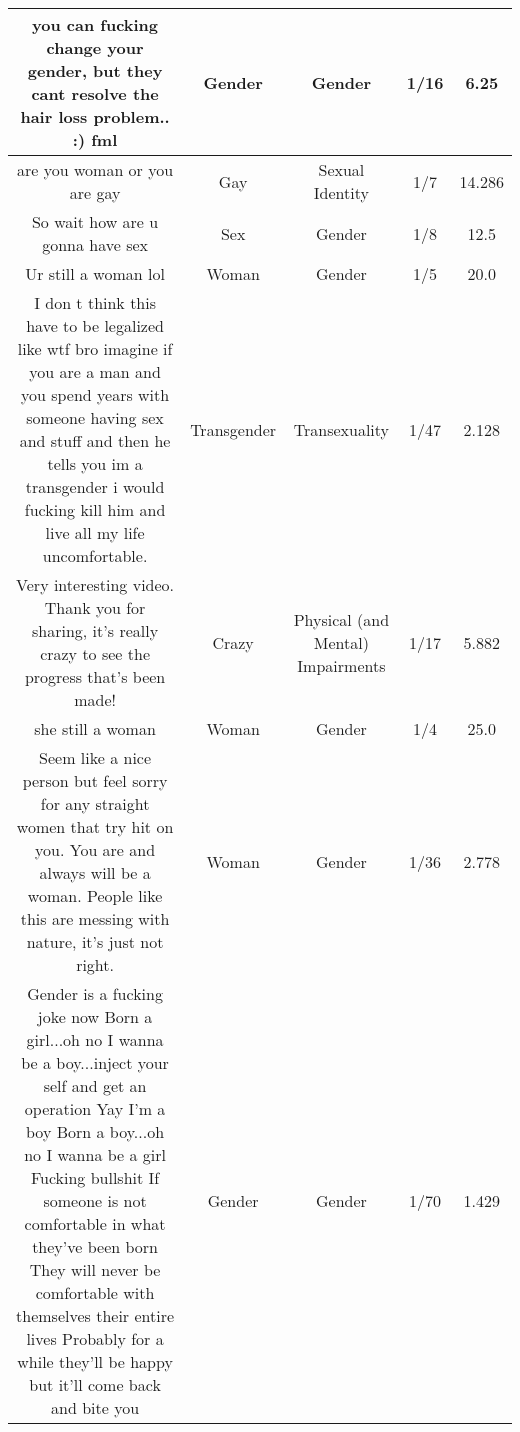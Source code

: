 \documentclass[11pt]{article}
\newlength\mylength
\begin{document}
\begin{center}
\begin{longtable}{|C{.40\mylength}|C{.30\mylength}|C{.15\mylength}|C{.15\mylength}|C{.15\mylength}|}
  you can fucking change your gender, but they cant resolve the hair loss problem.. :) fml  & Gender & Gender & 1/16 & 6.25 \\  \hline
  are you woman or you are gay  & Gay & Sexual Identity & 1/7 & 14.286 \\  \hline
  So wait how are u gonna have sex  & Sex & Gender & 1/8 & 12.5 \\  \hline
  Ur still a woman lol  & Woman & Gender & 1/5 & 20.0 \\  \hline
  I don t think this have to be legalized like wtf bro imagine if you are a man and you spend years with someone having sex and stuff and then he tells you im a transgender i would fucking kill him and live all my life uncomfortable.  & Transgender & Transexuality & 1/47 & 2.128 \\  \hline
  Very interesting video. Thank you for sharing, it's really crazy to see the progress that's been made!  & Crazy & Physical (and Mental) Impairments & 1/17 & 5.882 \\  \hline
  she still a woman  & Woman & Gender & 1/4 & 25.0 \\  \hline
  Seem like a nice person but feel sorry for any straight women that try hit on you. You are and always will be a woman. People like this are messing with nature, it's just not right.  & Woman & Gender & 1/36 & 2.778 \\  \hline
  Gender is a fucking joke now  Born a girl...oh no I wanna be a boy...inject your self and get an operation  Yay I'm a boy  Born a boy...oh no I wanna be a girl Fucking bullshit  If someone is not comfortable in what they've been born  They will never be comfortable with themselves their entire lives Probably for a while they'll be happy but it'll come back and bite you  & Gender & Gender & 1/70 & 1.429 \\  \hline

\end{longtable}
\end{center}
\end{document}
